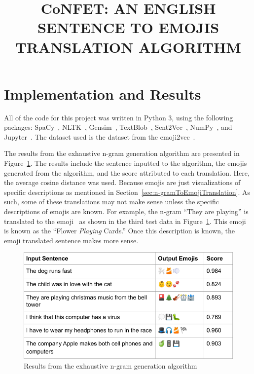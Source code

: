 \documentclass{article}[10]
\newcommand*{\img}[1]{%
  \raisebox{-.3\baselineskip}{%
    \texttt{[image: \#1]}%
  }%
} \title{{CoNFET:} AN ENGLISH SENTENCE TO EMOJIS TRANSLATION ALGORITHM}
\begin{document}
\section{Implementation and Results\label{sec:implementationAndResults}}

All of the code for this project was written in Python 3, using the following
packages: SpaCy~\cite{spacy2}, NLTK~\cite{bird2009natural},
Gensim~\cite{gensim}, TextBlob~\cite{TextBlob}, Sent2Vec~\cite{pg2017unsu},
NumPy~\cite{numpy}, and Jupyter~\cite{Kluyver:2016aa}. The dataset used is the
dataset from the emoji2vec~\cite{Eisner_2016}.

The results from the exhaustive n-gram generation algorithm are presented in
Figure~\ref{fig:extractive}. The results include the sentence inputted to the
algorithm, the emojis generated from the algorithm, and the score attributed to
each translation. Here, the average cosine distance was used.
Because emojis are just visualizations of specific descriptions as mentioned in
Section~\ref{sec:n-gramToEmojiTranslation}. As such, some of these translations
may not make sense unless the specific descriptions of emojis are known. For
example, the n-gram ``They are playing'' is translated to the
emoji~\img{emojis/1f3b4.png} as shown in the third test data in
Figure~\ref{fig:extractive}. This emoji is known as the ``Flower \emph{Playing}
Cards.'' Once this description is known, the emoji translated sentence makes
more sense.

\begin{figure}[H]
  \begin{center}
    \includegraphics[width=\columnwidth]{figures/extractive.png}
    \caption{Results from the exhaustive n-gram generation
      algorithm\label{fig:extractive}}
  \end{center}
\end{figure}
\end{document}
